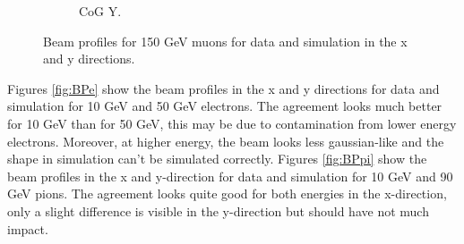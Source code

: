\begin{figure}[htbp!]
\begin{subfigure}[t]{0.49\textwidth}
    \caption{CoG Y.} \label{fig:mu150GeVY}
  \end{subfigure}
  \caption{Beam profiles for 150 GeV muons for data and simulation in the x and y directions.}
  \label{fig:BPmu}
\end{figure}

Figures \ref{fig:BPe} show the beam profiles in the x and y directions for data and simulation for 10 GeV and 50 GeV electrons. The agreement looks much better for 10 GeV than for 50 GeV, this may be due to contamination from lower energy electrons. Moreover, at higher energy, the beam looks less gaussian-like and the shape in simulation can't be simulated correctly. Figures \ref{fig:BPpi} show the beam profiles in the x and y-direction for data and simulation for 10 GeV and 90 GeV pions. The agreement looks quite good for both energies in the x-direction, only a slight difference is visible in the y-direction but should have not much impact.

